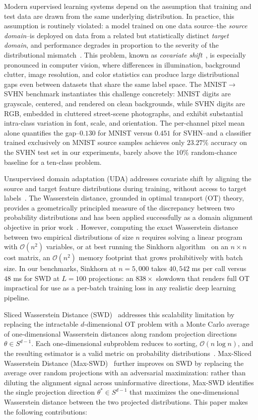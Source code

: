 \documentclass{article}
\begin{document}
	Modern supervised learning systems depend on the assumption that training and test data are drawn from the same underlying distribution. In practice, this assumption is routinely violated: a model trained on one data source--the \emph{source domain}--is deployed on data from a related but statistically distinct \emph{target domain}, and performance degrades in proportion to the severity of the distributional mismatch~\citep{ben}. This problem, known as \emph{covariate shift}~\citep{ben}, is especially pronounced in computer vision, where differences in illumination, background clutter, image resolution, and color statistics can produce large distributional gaps even between datasets that share the same label space. The MNIST$\to$SVHN benchmark instantiates this challenge concretely: MNIST digits are grayscale, centered, and rendered on clean backgrounds, while SVHN digits are RGB, embedded in cluttered street-scene photographs, and exhibit substantial intra-class variation in font, scale, and orientation. The per-channel pixel mean alone quantifies the gap--$0.130$ for MNIST versus $0.451$ for SVHN--and a classifier trained exclusively on MNIST source samples achieves only $23.27\%$ accuracy on the SVHN test set in our experiments, barely above the $10\%$ random-chance baseline for a ten-class problem.
	
	Unsupervised domain adaptation (UDA) addresses covariate shift by aligning the source and target feature distributions during training, without access to target labels~\citep{yaroslav}. The Wasserstein distance, grounded in optimal transport (OT) theory, provides a geometrically principled measure of the discrepancy between two probability distributions and has been applied successfully as a domain alignment objective in prior work~\citep{courty}. However, computing the exact Wasserstein distance between two empirical distributions of size $n$ requires solving a linear program with $\mathcal{O}(n^2)$ variables, or at best running the Sinkhorn algorithm~\citep{marco} on an $n \times n$ cost matrix, an $\mathcal{O}(n^2)$ memory footprint that grows prohibitively with batch size. In our benchmarks, Sinkhorn at $n = 5{,}000$ takes $40{,}542$ ms per call versus $48$ ms for SWD at $L = 100$ projections: an $838\times$ slowdown that renders full OT impractical for use as a per-batch training loss in any realistic deep learning pipeline.
	
	Sliced Wasserstein Distance (SWD)~\citep{rabin} addresses this scalability limitation by replacing the intractable $d$-dimensional OT problem with a Monte Carlo average of one-dimensional Wasserstein distances along random projection directions $\theta \in S^{d-1}$. Each one-dimensional subproblem reduces to sorting, $\mathcal{O}(n \log n)$, and the resulting estimator is a valid metric on probability distributions~\citep{bonneel}. Max-Sliced Wasserstein Distance (Max-SWD)~\citep{ishan} further improves on SWD by replacing the average over random projections with an adversarial maximization: rather than diluting the alignment signal across uninformative directions, Max-SWD identifies the single projection direction $\theta^* \in S^{d-1}$ that maximizes the one-dimensional Wasserstein distance between the two projected distributions. This paper makes the following contributions:
	
\end{document}
